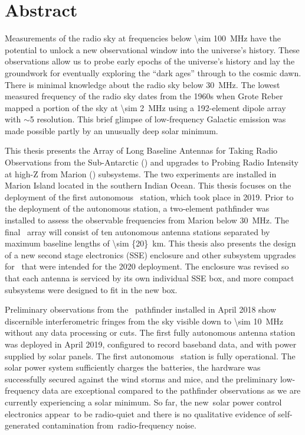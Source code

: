 \section*{Abstract}
	
Measurements of the radio sky at frequencies below \SI{\sim 100}{\mega \hertz} have the potential to unlock a new observational window into the universe’s history. These observations allow us to probe early epochs of the universe’s history and lay the groundwork for eventually exploring the “dark ages” through to the cosmic dawn. There is minimal knowledge about the radio sky below \SI{30}{\mega \hertz}. The lowest measured frequency of the radio sky dates from the 1960s when Grote Reber mapped a portion of the sky at \SI{\sim 2}{\mega \hertz} using a 192-element dipole array with $\sim$5 \degree resolution. This brief glimpse of low-frequency Galactic emission was made possible partly by an unusually deep solar minimum.

This thesis presents the Array of Long Baseline Antennas for Taking Radio Observations from the Sub-Antarctic (\albatros) and upgrades to Probing Radio Intensity at high-Z from Marion (\prizm) subsystems.  The two experiments are installed in Marion Island located in the southern Indian Ocean.  This thesis focuses on the deployment of the first autonomous \albatros\ station, which took place in 2019. Prior to the deployment of the autonomous station, a two-element pathfinder was installed to assess the observable frequencies from Marion below \SI{30}{\mega \hertz}. The final \albatros\ array will consist of ten autonomous antenna stations separated by maximum baseline lengths of \SI{\sim {20}}{km}. This thesis also presents the design of a new second stage electronics (SSE) enclosure and other subsystem upgrades for \prizm\ that were intended for the 2020 deployment. The enclosure was revised so that each antenna is serviced by its own individual SSE box, and more compact subsystems were designed to fit in the new box.

Preliminary observations from the \albatros\ pathfinder installed in April 2018 show discernible interferometric fringes from the sky visible down to \SI{\sim 10}{\mega \hertz} without any data processing or cuts. The first fully autonomous antenna station was deployed in April 2019, configured to record baseband data, and with power supplied by solar panels. The first autonomous \albatros\ station is fully operational. The solar power system sufficiently charges the batteries, the hardware was successfully secured against the wind storms and mice, and the preliminary low-frequency data are exceptional compared to the pathfinder observations as we are currently experiencing a solar minimum. So far, the new solar power control electronics appear to be radio-quiet and there is no qualitative evidence of self-generated contamination from radio-frequency noise.

